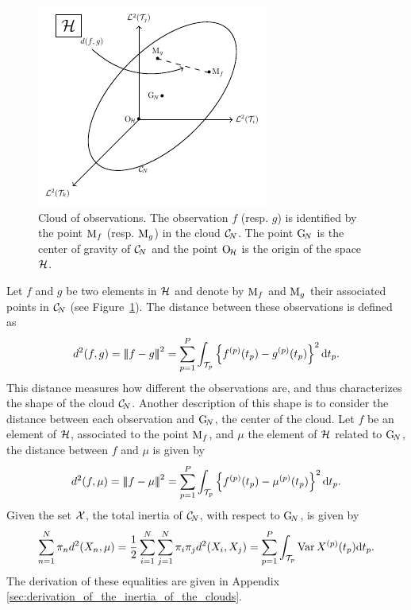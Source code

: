 \begin{figure}
    \centering
    \includegraphics[scale=1.2]{figures/cloud_obs.pdf}
    \caption{Cloud of observations. The observation $f$ (resp. $g$) is identified by the point $\mathrm{M}_f$ (resp. $\mathrm{M}_g$) in the cloud $\mathcal{C}_{\!N}$. The point $\mathrm{G}_{\!N}$ is the center of gravity of $\mathcal{C}_{\!N}$ and the point $\mathrm{O}_{\!\mathcal{H}}$ is the origin of the space $\mathcal{H}$.}
    \label{fig:cloud_obs}
\end{figure}

Let $f$ and $g$ be two elements in $\mathcal{H}$ and denote by $\mathrm{M}_f$ and $\mathrm{M}_g$ their associated points in $\mathcal{C}_{\!N}$ (see Figure~\ref{fig:cloud_obs}). The distance between these observations is defined as
\begin{equation}\label{eq:distance_obs}
    d^2(f, g) = \left|\!\left|\!\left|f - g\right|\!\right|\!\right|^2 = \sum_{p = 1}^P \int_{\mathcal{T}_{p}}\left\{f^{(p)}(t_p) - g^{(p)}(t_p)\right\}^2 {\rm d} t_p.
\end{equation}
This distance measures how different the observations are, and thus characterizes the shape of the cloud $\mathcal{C}_{\!N}$. Another description of this shape is to consider the distance between each observation and $\mathrm{G}_{\!N}$, the center of the cloud. Let $f$ be an element of $\mathcal{H}$, associated to the point $\mathrm{M}_f$, and $\mu$ the element of $\mathcal{H}$ related to $\mathrm{G}_{\!N}$, the distance between $f$ and $\mu$ is given by
\begin{equation}\label{eq:distance_center}
    d^2(f, \mu) = \left|\!\left|\!\left|f - \mu\right|\!\right|\!\right|^2 = \sum_{p = 1}^P \int_{\mathcal{T}_{p}}\left\{f^{(p)}(t_p) - \mu^{(p)}(t_p)\right\}^2 {\rm d} t_p.
\end{equation}
Given the set $\mathcal{X}$, the total inertia of $\mathcal{C}_{\!N}$, with respect to $\mathrm{G}_{\!N}$, is given by
\begin{equation}\label{eq:inertia}
    \sum_{n = 1}^N \pi_n d^2(X_n, \mu) = \frac{1}{2}\sum_{i = 1}^N \sum_{j = 1}^N \pi_i \pi_j d^2(X_i, X_j) = \sum_{p = 1}^P \int_{\mathcal{T}_{p}}\operatorname{Var}{X^{(p)}(t_p)} {\rm d} t_p.
\end{equation}
The derivation of these equalities are given in Appendix \ref{sec:derivation_of_the_inertia_of_the_clouds}.

